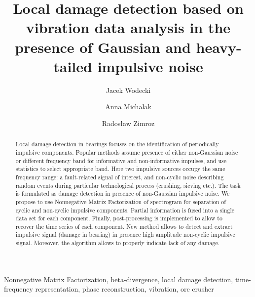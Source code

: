 \documentclass[3p,times]{elsarticle}
\begin{document}
\begin{frontmatter}

\title{Local damage detection based on vibration data analysis in the presence of Gaussian and heavy-tailed impulsive noise}


\author[label1]{Jacek Wodecki}
\author[label1]{Anna Michalak }
\author[label1]{Rados{\l}aw Zimroz}

\address[label1]{Faculty of Geoengineering, Mining and Geology, Wroclaw University of Science and Technology, Na Grobli 15, 50-421 Wroclaw, Poland
\\\{jacek.wodecki, anna.michalak radoslaw.zimroz\}@pwr.edu.pl\\}

\begin{abstract}

Local damage detection in bearings focuses on the identification of periodically impulsive components. Popular methods assume presence of either non-Gaussian noise or different frequency band for informative and non-informative impulses, and use statistics to select appropriate band. Here two impulsive sources occupy the same frequency range: a fault-related signal of interest, and non-cyclic noise describing random events during particular technological process (crushing, sieving etc.). The task is formulated as damage detection in presence of non-Gaussian impulsive noise. We propose to use Nonnegative Matrix Factorization of spectrogram for separation of cyclic and non-cyclic impulsive components. Partial information is fused into a single data set for each component. Finally, post-processing is implemented to allow to recover the time series of each component. New method allows to detect and extract impulsive signal (damage in bearing) in presence high amplitude non-cyclic impulsive signal. Moreover, the algorithm allows to properly indicate lack of any damage.

\end{abstract}




\begin{keyword}
Nonnegative Matrix Factorization, beta-divergence, local damage detection, time-frequency representation, phase reconstruction, vibration, ore crusher
\end{keyword}

\end{frontmatter}
\end{document}
